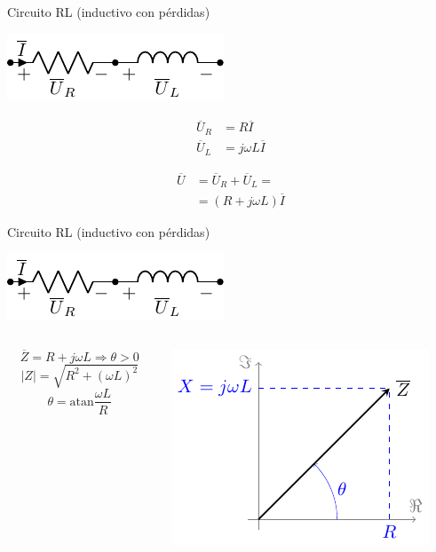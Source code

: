 \documentclass[aspectratio=169, usenames,svgnames,dvipsnames]{beamer}
\newcommand{\atan}{\mathrm{atan}}
\begin{document}
\begin{frame}[label={sec:org0cc8897}]{Circuito RL (inductivo con pérdidas)}
\begin{center}
\includegraphics[height=0.2\textheight]{../figs/RL.pdf}
\end{center}

\begin{align*}
  \overline{U}_R &= R \overline{I}\\
  \overline{U}_L &= j\omega L \overline{I}
\end{align*}

\begin{align*}
  \overline{U} &= \overline{U}_R + \overline{U}_L =\\
	       &=(R + j\omega L) \overline{I}
\end{align*}
\end{frame}
\begin{frame}[label={sec:org27ec778}]{Circuito RL (inductivo con pérdidas)}
\begin{center}
\includegraphics[height=0.2\textheight]{../figs/RL.pdf}
\end{center}

\begin{columns}
\begin{column}{0.45\columnwidth}
\[
\overline{Z} = R + j\omega L \Rightarrow \boxed{\theta > 0}
\]
\[
  |Z| = \sqrt{R^2 + (\omega L)^2}
\]
\[
  \theta = \atan{\frac{\omega L}{R}}
\]
\end{column}

\begin{column}{0.55\columnwidth}
\begin{center}
\includegraphics[width=.9\linewidth]{../figs/fasorInductanciaReal.pdf}
\end{center}
\end{column}
\end{columns}
\end{frame}
\end{document}
